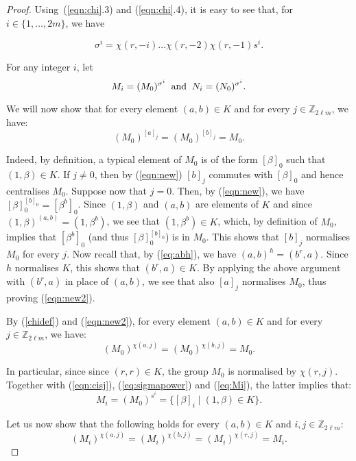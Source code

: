 \documentclass{amsart}
\theoremstyle{definition}
\begin{document}
\begin{proof}
Using~(\ref{eqn:chi}.3) and (\ref{eqn:chi}.4), it is easy to see that, for $i\in \{1,\ldots,2m\}$, we have

\begin{equation}
\label{eq:sigmapower}
\sigma^i = \chi(r,-i)\ldots \chi(r,-2)\chi(r,-1)s^i. 
\end{equation}

For any integer $i$, let 
\begin{equation}
\label{eq:Mi}
M_i=(M_0)^{\sigma^i}\> \hbox{ and } \> N_i=(N_0)^{\sigma^i}.
\end{equation}

We will now show that for every element $(a,b) \in K$ and  for every $j\in {\mathbb Z}_{2\ell m}$, we have:
\begin{equation}
\label{eqn:new2}
 (M_0)^{[a]_j}=(M_0)^{[b]_j}= M_0.
\end{equation}

Indeed, by definition, a typical element of $M_0$ is of the form $[\beta]_0$  such that $(1,\beta)\in K$. If $j\not = 0$, then by (\ref{eqn:new})  $[b]_j$ commutes with $[\beta]_0$ and hence centralises $M_0$. Suppose now that $j=0$. Then, by (\ref{eqn:new}), we have $[\beta]_0^{[b]_0} = [\beta^b]_0$. Since $(1,\beta)$ and $(a,b)$ are elements of $K$ and since $(1,\beta)^{(a,b)} = (1,\beta^b)$, we see that $(1,\beta^b)\in K$, which, by definition of $M_0$, implies that $[\beta^b]_0$ (and thus $[\beta]_0^{[b]_0}$) is in $M_0$. This shows that $[b]_j$ normalises $M_0$ for every $j$. Now recall that, by (\ref{eq:abh}), we have $(a,b)^h = (b^r,a)$. Since $h$ normalises $K$, this shows that $(b^r,a)\in K$. By applying the above argument with $(b^r,a)$ in place of $(a,b)$, we see that also $[a]_j$ normalises $M_0$, thus proving (\ref{eqn:new2}). 

By (\ref{chidef}) and (\ref{eqn:new2}),  for every element $(a,b) \in K$ and  for every $j\in {\mathbb Z}_{2\ell m}$, we have:
\begin{equation}
\label{eqn:new3}
(M_0)^{\chi(a,j)}=(M_0)^{\chi(b,j)} = M_0.
\end{equation}
 
 In particular, since since $(r,r)\in K$, the group $M_0$ is normalised by $\chi(r,j)$.
Together with (\ref{eqn:cisj}), (\ref{eq:sigmapower}) and (\ref{eq:Mi}), the latter implies that:
 \begin{equation}
 \label{eqn:Mis}
 M_i= (M_0)^{s^i} = \{ [\beta]_i \mid (1,\beta) \in K\}.
 \end{equation}

Let us now show that the following holds for every $(a,b)\in K$ and $i, j \in {\mathbb Z}_{2\ell m}$:
 \begin{equation}
 \label{eqn:Michi}
 (M_i)^{\chi(a,j)}=(M_i)^{\chi(b,j)}=(M_i)^{\chi(r,j)} = M_i.
\end{equation}


\end{proof}
\end{document}
